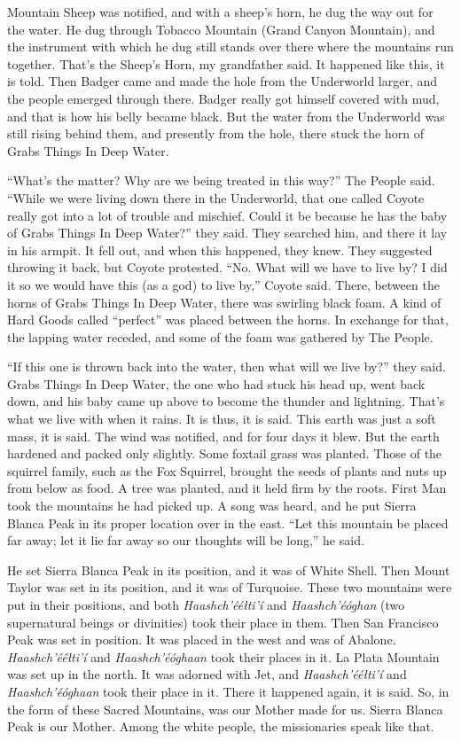 Mountain Sheep was notified, and with a sheep's horn, he dug the way out for the water. He dug through Tobacco Mountain (Grand Canyon Mountain), and the instrument with which he dug still stands over there where the mountains run together. That's the Sheep's Horn, my grandfather said. It happened like this, it is told. Then Badger came and made the hole from the Underworld larger, and the people emerged through there. Badger really got himself covered with mud, and that is how his belly became black. But the water from the Underworld was still rising behind them, and presently from the hole, there stuck the horn of Grabs Things In Deep Water.

``What's the matter? Why are we being treated in this way?'' The People said. ``While we were living down there in the Underworld, that one called Coyote really got into a lot of trouble and mischief. Could it be because he has the baby of Grabs Things In Deep Water?'' they said. They searched him, and there it lay in his armpit. It fell out, and when this happened, they knew. They suggested throwing it back, but Coyote protested. ``No. What will we have to live by? I did it so we would have this (as a god) to live by,'' Coyote said. There, between the horns of Grabs Things In Deep Water, there was swirling black foam. A kind of Hard Goods called ``perfect'' was placed between the horns. In exchange for that, the lapping water receded, and some of the foam was gathered by The People.

``If this one is thrown back into the water, then what will we live by?'' they said. Grabs Things In Deep Water, the one who had stuck his head up, went back down, and his baby came up above to become the thunder and lightning. That's what we live with when it rains. It is thus, it is said. This earth was just a soft mass, it is said. The wind was notified, and for four days it blew. But the earth hardened and packed only slightly. Some foxtail grass was planted. Those of the squirrel family, such as the Fox Squirrel, brought the seeds of plants and nuts up from below as food. A tree was planted, and it held firm by the roots. First Man took the mountains he had picked up. A song was heard, and he put Sierra Blanca Peak in its proper location over in the east. ``Let this mountain be placed far away; let it lie far away so our thoughts will be long,'' he said.

He set Sierra Blanca Peak in its position, and it was of White Shell. Then Mount Taylor was set in its position, and it was of Turquoise. These two mountains were put in their positions, and both \textit{Haashch'ééłti’í} and \textit{Haashch'éóghan} (two supernatural beings or divinities) took their place in them. Then San Francisco Peak was set in position. It was placed in the west and was of Abalone. \textit{Haashch'ééłti'í} and \textit{Haashch'éóghaan} took their places in it. La Plata Mountain was set up in the north. It was adorned with Jet, and \textit{Haashch'ééłti'í} and \textit{Haashch'éóghaan} took their place in it. There it happened again, it is said. So, in the form of these Sacred Mountains, was our Mother made for us. Sierra Blanca Peak is our Mother. Among the white people, the missionaries speak like that.


